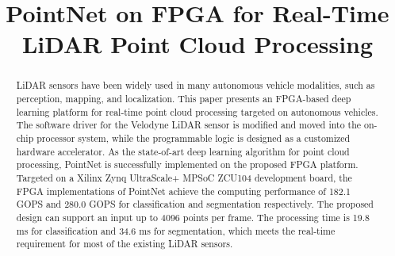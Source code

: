 \documentclass[conference]{IEEEtran}
\begin{document}
%
\title{PointNet on FPGA for Real-Time LiDAR Point Cloud Processing}


\author{
}


\maketitle

\begin{abstract}
LiDAR sensors have been widely used in many autonomous vehicle modalities, such as perception, mapping,  and localization. This paper presents an FPGA-based deep learning platform for real-time point cloud processing targeted on autonomous vehicles. The software driver for the Velodyne LiDAR sensor is modified and moved into the on-chip processor system, while the programmable logic is designed as a customized hardware accelerator. As the state-of-art deep learning algorithm for point cloud processing, PointNet is successfully implemented on the proposed FPGA platform. Targeted on a Xilinx Zynq UltraScale+ MPSoC ZCU104 development board, the FPGA implementations of PointNet achieve the computing performance of 182.1 GOPS and 280.0 GOPS for classification and segmentation respectively. The proposed design can support an input up to 4096 points per frame. The processing time is 19.8 ms for classification and 34.6 ms for segmentation, which meets the real-time requirement for most of the existing LiDAR sensors.
\end{abstract}
\end{document}
